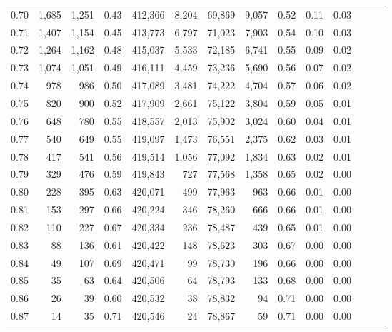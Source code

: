 \begin{tabular}{rrrrrrrrrrrrrr}
0.70 &   1,685 &  1,251 &  0.43 &  412,366 &    8,204 &  69,869 &   9,057 &  0.52 &  0.11 &      0.03 \\
0.71 &   1,407 &  1,154 &  0.45 &  413,773 &    6,797 &  71,023 &   7,903 &  0.54 &  0.10 &      0.03 \\
0.72 &   1,264 &  1,162 &  0.48 &  415,037 &    5,533 &  72,185 &   6,741 &  0.55 &  0.09 &      0.02 \\
0.73 &   1,074 &  1,051 &  0.49 &  416,111 &    4,459 &  73,236 &   5,690 &  0.56 &  0.07 &      0.02 \\
0.74 &     978 &    986 &  0.50 &  417,089 &    3,481 &  74,222 &   4,704 &  0.57 &  0.06 &      0.02 \\
0.75 &     820 &    900 &  0.52 &  417,909 &    2,661 &  75,122 &   3,804 &  0.59 &  0.05 &      0.01 \\
0.76 &     648 &    780 &  0.55 &  418,557 &    2,013 &  75,902 &   3,024 &  0.60 &  0.04 &      0.01 \\
0.77 &     540 &    649 &  0.55 &  419,097 &    1,473 &  76,551 &   2,375 &  0.62 &  0.03 &      0.01 \\
0.78 &     417 &    541 &  0.56 &  419,514 &    1,056 &  77,092 &   1,834 &  0.63 &  0.02 &      0.01 \\
0.79 &     329 &    476 &  0.59 &  419,843 &      727 &  77,568 &   1,358 &  0.65 &  0.02 &      0.00 \\
0.80 &     228 &    395 &  0.63 &  420,071 &      499 &  77,963 &     963 &  0.66 &  0.01 &      0.00 \\
0.81 &     153 &    297 &  0.66 &  420,224 &      346 &  78,260 &     666 &  0.66 &  0.01 &      0.00 \\
0.82 &     110 &    227 &  0.67 &  420,334 &      236 &  78,487 &     439 &  0.65 &  0.01 &      0.00 \\
0.83 &      88 &    136 &  0.61 &  420,422 &      148 &  78,623 &     303 &  0.67 &  0.00 &      0.00 \\
0.84 &      49 &    107 &  0.69 &  420,471 &       99 &  78,730 &     196 &  0.66 &  0.00 &      0.00 \\
0.85 &      35 &     63 &  0.64 &  420,506 &       64 &  78,793 &     133 &  0.68 &  0.00 &      0.00 \\
0.86 &      26 &     39 &  0.60 &  420,532 &       38 &  78,832 &      94 &  0.71 &  0.00 &      0.00 \\
0.87 &      14 &     35 &  0.71 &  420,546 &       24 &  78,867 &      59 &  0.71 &  0.00 &      0.00 \\

\end{tabular}
